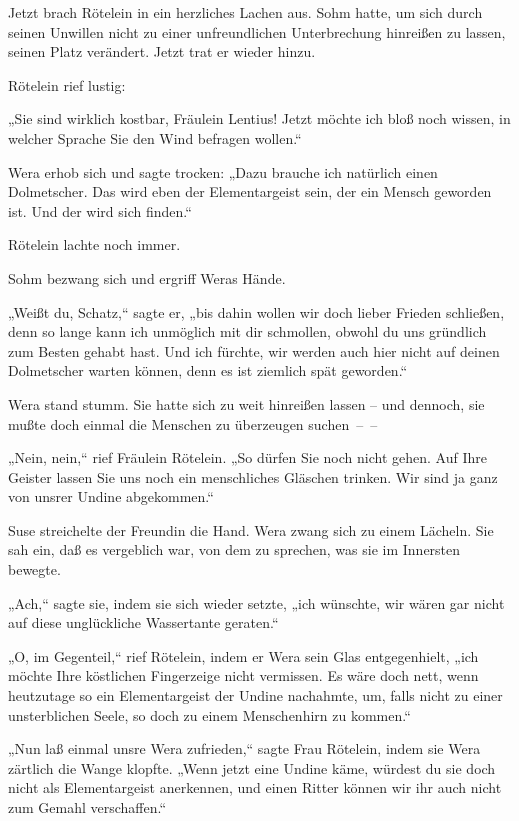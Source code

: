 Jetzt brach Rötelein in ein herzliches Lachen aus. Sohm hatte, um
sich durch seinen Unwillen nicht zu einer unfreundlichen
Unterbrechung hinreißen zu lassen, seinen Platz verändert. Jetzt
trat er wieder hinzu.

Rötelein rief lustig:

„Sie sind wirklich kostbar, Fräulein Lentius! Jetzt möchte ich bloß
noch wissen, in welcher Sprache Sie den Wind befragen wollen.“

Wera erhob sich und sagte trocken: „Dazu brauche ich natürlich
einen Dolmetscher. Das wird eben der Elementargeist sein, der ein
Mensch geworden ist. Und der wird sich finden.“

Rötelein lachte noch immer.

Sohm bezwang sich und ergriff Weras Hände.

„Weißt du, Schatz,“ sagte er, „bis dahin wollen wir doch lieber
Frieden schließen, denn so lange kann ich unmöglich mit dir
schmollen, obwohl du uns gründlich zum Besten gehabt hast. Und ich
fürchte, wir werden auch hier nicht auf deinen Dolmetscher warten
können, denn es ist ziemlich spät geworden.“

Wera stand stumm. Sie hatte sich zu weit hinreißen lassen – und
dennoch, sie mußte doch einmal die Menschen zu überzeugen
suchen~–~–

„Nein, nein,“ rief Fräulein Rötelein. „So dürfen Sie noch nicht
gehen. Auf Ihre Geister lassen Sie uns noch ein menschliches
Gläschen trinken. Wir sind ja ganz von unsrer Undine abgekommen.“

Suse streichelte der Freundin die Hand. Wera zwang sich zu einem
Lächeln. Sie sah ein, daß es vergeblich war, von dem zu sprechen,
was sie im Innersten bewegte.

„Ach,“ sagte sie, indem sie sich wieder setzte, „ich wünschte, wir
wären gar nicht auf diese unglückliche Wassertante geraten.“

„O, im Gegenteil,“ rief Rötelein, indem er Wera sein Glas
entgegenhielt, „ich möchte Ihre köstlichen Fingerzeige nicht
vermissen. Es wäre doch nett, wenn heutzutage so ein Elementargeist
der Undine nachahmte, um, falls nicht zu einer unsterblichen Seele,
so doch zu einem Menschenhirn zu kommen.“

„Nun laß einmal unsre Wera zufrieden,“ sagte Frau Rötelein, indem
sie Wera zärtlich die Wange klopfte. „Wenn jetzt eine Undine käme,
würdest du sie doch nicht als Elementargeist anerkennen, und einen
Ritter können wir ihr auch nicht zum Gemahl verschaffen.“

